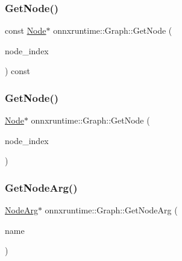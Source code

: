 \mbox{\label{classonnxruntime_1_1Graph_aec5e2348351170dc20d2c5a14b0a889c}} 
\subsubsection{\texorpdfstring{Get\+Node()}{GetNode()}\hspace{0.1cm}{\footnotesize\ttfamily [1/2]}}
{\footnotesize\ttfamily const \mbox{\hyperlink{classonnxruntime_1_1Node}{Node}}$\ast$ onnxruntime\+::\+Graph\+::\+Get\+Node (\begin{DoxyParamCaption}\item[{\mbox{\hyperlink{namespaceonnxruntime_af8773b5c12b5d8fd9292eb2e268df760}{Node\+Index}}}]{node\+\_\+index }\end{DoxyParamCaption}) const\hspace{0.3cm}{\ttfamily [inline]}}

\mbox{\label{classonnxruntime_1_1Graph_a39d036c40a8ffd4fe06ecbb472b3cfb8}} 
\subsubsection{\texorpdfstring{Get\+Node()}{GetNode()}\hspace{0.1cm}{\footnotesize\ttfamily [2/2]}}
{\footnotesize\ttfamily \mbox{\hyperlink{classonnxruntime_1_1Node}{Node}}$\ast$ onnxruntime\+::\+Graph\+::\+Get\+Node (\begin{DoxyParamCaption}\item[{\mbox{\hyperlink{namespaceonnxruntime_af8773b5c12b5d8fd9292eb2e268df760}{Node\+Index}}}]{node\+\_\+index }\end{DoxyParamCaption})\hspace{0.3cm}{\ttfamily [inline]}}

\mbox{\label{classonnxruntime_1_1Graph_ae7aacecdca718dca43c64ac05cdc1c91}} 
\subsubsection{\texorpdfstring{Get\+Node\+Arg()}{GetNodeArg()}\hspace{0.1cm}{\footnotesize\ttfamily [1/2]}}
{\footnotesize\ttfamily \mbox{\hyperlink{classonnxruntime_1_1NodeArg}{Node\+Arg}}$\ast$ onnxruntime\+::\+Graph\+::\+Get\+Node\+Arg (\begin{DoxyParamCaption}\item[{const std\+::string \&}]{name }\end{DoxyParamCaption})\hspace{0.3cm}{\ttfamily [inline]}}

